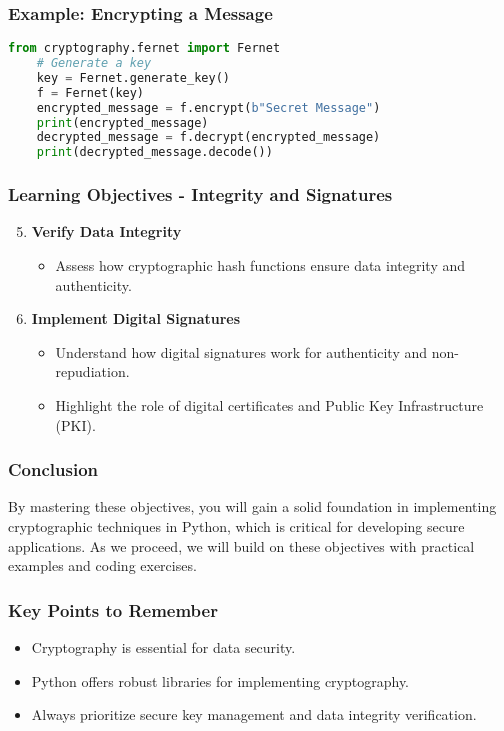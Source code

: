 \documentclass{beamer}
\begin{document}
\begin{frame}[fragile]
    \frametitle{Example: Encrypting a Message}
    \begin{lstlisting}[language=Python]
    from cryptography.fernet import Fernet
    # Generate a key
    key = Fernet.generate_key()
    f = Fernet(key)
    encrypted_message = f.encrypt(b"Secret Message")
    print(encrypted_message)
    decrypted_message = f.decrypt(encrypted_message)
    print(decrypted_message.decode())
    \end{lstlisting}
\end{frame}

\begin{frame}
    \frametitle{Learning Objectives - Integrity and Signatures}
    \begin{enumerate}
        \setcounter{enumi}{4}
        \item \textbf{Verify Data Integrity}
        \begin{itemize}
            \item Assess how cryptographic hash functions ensure data integrity and authenticity.
        \end{itemize}
        
        \item \textbf{Implement Digital Signatures}
        \begin{itemize}
            \item Understand how digital signatures work for authenticity and non-repudiation.
            \item Highlight the role of digital certificates and Public Key Infrastructure (PKI).
        \end{itemize}
    \end{enumerate}
\end{frame}

\begin{frame}
    \frametitle{Conclusion}
    By mastering these objectives, you will gain a solid foundation in implementing cryptographic techniques in Python, which is critical for developing secure applications.
    As we proceed, we will build on these objectives with practical examples and coding exercises.
\end{frame}

\begin{frame}
    \frametitle{Key Points to Remember}
    \begin{itemize}
        \item Cryptography is essential for data security.
        \item Python offers robust libraries for implementing cryptography.
        \item Always prioritize secure key management and data integrity verification.
    \end{itemize}
\end{frame}
\end{document}
